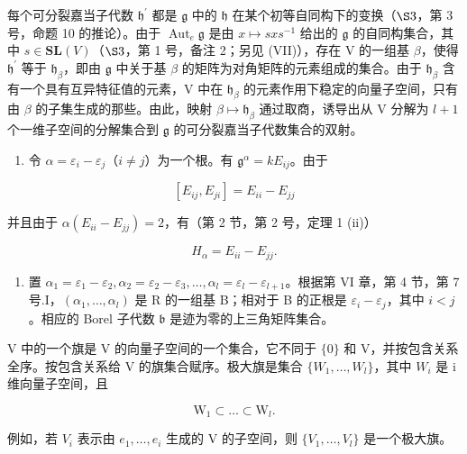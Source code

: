 每个可分裂嘉当子代数 \(\mathfrak{h}^{\prime}\) 都是 \(\mathfrak{g}\) 中的 \(\mathfrak{h}\) 在某个初等自同构下的变换（\(\S3\)，第 3 号，命题 10 的推论）。由于 \(\operatorname{Aut}_{e}\mathfrak{g}\) 是由 \(x \mapsto sxs^{-1}\) 给出的 \(\mathfrak{g}\) 的自同构集合，其中 \(s \in \mathbf{SL}(V)\)（\(\S3\)，第 1 号，备注 2；另见 (VII)），存在 V 的一组基 \(\beta\)，使得 \(\mathfrak{h}^{\prime}\) 等于 \(\mathfrak{h}_{\beta}\)，即由 \(\mathfrak{g}\) 中关于基 \(\beta\) 的矩阵为对角矩阵的元素组成的集合。由于 \(\mathfrak{h}_{\beta}\) 含有一个具有互异特征值的元素，V 中在 \(\mathfrak{h}_{\beta}\) 的元素作用下稳定的向量子空间，只有由 \(\beta\) 的子集生成的那些。由此，映射 \(\beta \mapsto \mathfrak{h}_{\beta}\) 通过取商，诱导出从 V 分解为 \(l + 1\) 个一维子空间的分解集合到 \(\mathfrak{g}\) 的可分裂嘉当子代数集合的双射。

\begin{enumerate}
\def\labelenumi{(\Roman{enumi})}
\setcounter{enumi}{1}
\tightlist
\item
  令 \(\alpha = \varepsilon_{i} - \varepsilon_{j}\)（\(i \neq j\)）为一个根。有 \(\mathfrak{g}^{\alpha} = kE_{ij}\)。由于
\end{enumerate}

\[
[ E _ {i j}, E _ {j i} ] = E _ {i i} - E _ {j j}
\]

并且由于 \(\alpha(E_{ii} - E_{jj}) = 2\)，有（第 2 节，第 2 号，定理 1 (ii)）

\[
H _ {\alpha} = E _ {i i} - E _ {j j}.
\]

\begin{enumerate}
\def\labelenumi{(\Roman{enumi})}
\setcounter{enumi}{2}
\tightlist
\item
  置 \(\alpha_{1} = \varepsilon_{1} - \varepsilon_{2},\alpha_{2} = \varepsilon_{2} - \varepsilon_{3},\ldots ,\alpha_{l} = \varepsilon_{l} - \varepsilon_{l + 1}\)。根据第 VI 章，第 4 节，第 7 号.I，\((\alpha_{1},\dots,\alpha_{l})\) 是 R 的一组基 B；相对于 B 的正根是 \(\varepsilon_i - \varepsilon_j\)，其中 \(i < j\)。相应的 Borel 子代数 \(\mathfrak{b}\) 是迹为零的上三角矩阵集合。
\end{enumerate}

V 中的一个旗是 V 的向量子空间的一个集合，它不同于 \(\{0\}\) 和 V，并按包含关系全序。按包含关系给 V 的旗集合赋序。极大旗是集合 \(\{W_{1},\ldots,W_{l}\}\)，其中 \(W_{i}\) 是 i 维向量子空间，且

\[
\mathrm{W} _ {1} \subset \dots \subset \mathrm{W} _ {l}.
\]

例如，若 \(V_{i}\) 表示由 \(e_{1},\ldots,e_{i}\) 生成的 V 的子空间，则 \(\{V_{1},\ldots,V_{l}\}\) 是一个极大旗。

